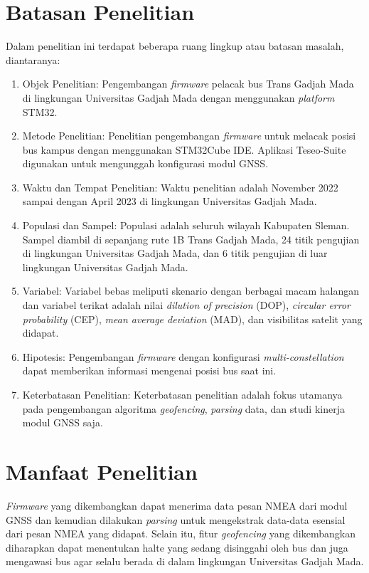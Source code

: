 \section{Batasan Penelitian}
Dalam penelitian ini terdapat beberapa ruang lingkup atau batasan masalah, diantaranya:
\begin{enumerate}
	\item Objek Penelitian: Pengembangan \textit{firmware} pelacak bus Trans Gadjah Mada di lingkungan Universitas Gadjah Mada dengan menggunakan \textit{platform} STM32.
	\item Metode Penelitian: Penelitian pengembangan \textit{firmware} untuk melacak posisi bus kampus dengan menggunakan STM32Cube IDE. Aplikasi Teseo-Suite digunakan untuk mengunggah konfigurasi modul GNSS.
	\item Waktu dan Tempat Penelitian: Waktu penelitian adalah November 2022 sampai dengan April 2023 di lingkungan Universitas Gadjah Mada.
	\item Populasi dan Sampel: Populasi adalah seluruh wilayah Kabupaten Sleman. Sampel diambil di sepanjang rute 1B Trans Gadjah Mada, 24 titik pengujian di lingkungan Universitas Gadjah Mada, dan 6 titik pengujian di luar lingkungan Universitas Gadjah Mada.
	\item Variabel: Variabel bebas meliputi skenario dengan berbagai macam halangan dan variabel terikat adalah nilai \textit{dilution of precision} (DOP), \textit{circular error probability} (CEP), \textit{mean average deviation} (MAD), dan visibilitas satelit yang didapat.
	\item Hipotesis: Pengembangan \textit{firmware} dengan konfigurasi \textit{multi-constellation} dapat memberikan informasi mengenai posisi bus saat ini.
	\item Keterbatasan Penelitian: Keterbatasan penelitian adalah fokus utamanya pada pengembangan algoritma \textit{geofencing}, \textit{parsing} data, dan studi kinerja modul GNSS saja.
\end{enumerate}

\section{Manfaat Penelitian}
\textit{Firmware} yang dikembangkan dapat menerima data pesan NMEA dari modul GNSS dan kemudian dilakukan \textit{parsing} untuk mengekstrak data-data esensial dari pesan NMEA yang didapat. Selain itu, fitur \textit{geofencing} yang dikembangkan diharapkan dapat menentukan halte yang sedang disinggahi oleh bus dan juga mengawasi bus agar selalu berada di dalam lingkungan Universitas Gadjah Mada.

